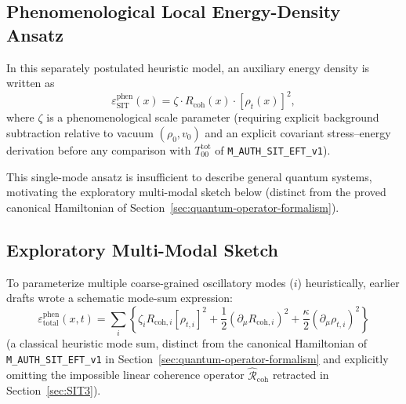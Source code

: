 \subsection{Phenomenological Local Energy-Density Ansatz}
In this separately postulated heuristic model, an auxiliary energy density is written as
\begin{equation}
    \varepsilon_{\mathrm{SIT}}^{\mathrm{phen}}(x) = \zeta \cdot R_{\mathrm{coh}}(x) \cdot [\rho_t(x)]^2,
    \label{eq:local_energy_density}
\end{equation}
where $\zeta$ is a phenomenological scale parameter (requiring explicit background subtraction relative to vacuum $(\rho_0, v_0)$ and an explicit covariant stress--energy derivation before any comparison with $T_{00}^{\mathrm{tot}}$ of \texttt{M\_AUTH\_SIT\_EFT\_v1}).

This single-mode ansatz is insufficient to describe general quantum systems, motivating the exploratory multi-modal sketch below (distinct from the proved canonical Hamiltonian of Section~\ref{sec:quantum-operator-formalism}).

\subsection{Exploratory Multi-Modal Sketch}
To parameterize multiple coarse-grained oscillatory modes ($i$) heuristically, earlier drafts wrote a schematic mode-sum expression:
\begin{equation}
    \varepsilon_{\mathrm{total}}^{\mathrm{phen}}(x,t) = \sum_i \left\{ \zeta_i R_{\mathrm{coh},i} [\rho_{t,i}]^2 + \frac{1}{2}(\partial_\mu R_{\mathrm{coh},i})^2 + \frac{\kappa}{2}(\partial_\mu \rho_{t,i})^2 \right\}
    \label{eq:full_functional}
\end{equation}
(a classical heuristic mode sum, distinct from the canonical Hamiltonian of \texttt{M\_AUTH\_SIT\_EFT\_v1} in Section~\ref{sec:quantum-operator-formalism} and explicitly omitting the impossible linear coherence operator $\hat{\mathcal{R}}_{\mathrm{coh}}$ retracted in Section~\ref{sec:SIT3}).


